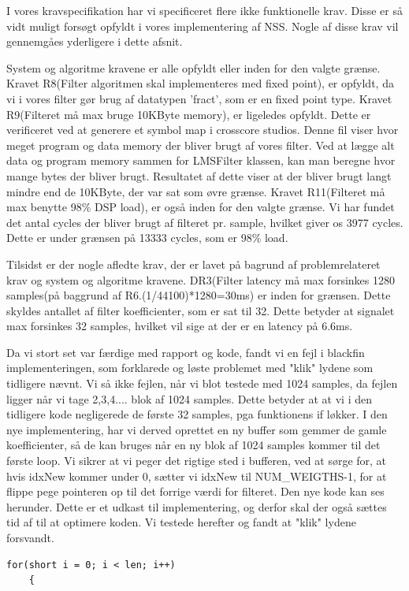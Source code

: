 \begin{description}[align=left]
I vores kravspecifikation har vi specificeret flere ikke funktionelle krav. Disse er så vidt muligt forsøgt opfyldt i vores implementering af NSS. Nogle af disse krav vil gennemgåes yderligere i dette afsnit.

System og algoritme kravene er alle opfyldt eller inden for den valgte grænse. Kravet R8(Filter algoritmen skal implementeres med fixed point), er opfyldt, da vi i vores filter gør brug af datatypen 'fract', som er en fixed point type. Kravet R9(Filteret må max bruge 10KByte memory), er ligeledes opfyldt. Dette er verificeret ved at generere et symbol map i crosscore studios. Denne fil viser hvor meget program og data memory der bliver brugt af vores filter. Ved at lægge alt data og program memory sammen for LMSFilter klassen, kan man beregne hvor mange bytes der bliver brugt. Resultatet af dette viser at der bliver brugt langt mindre end de 10KByte, der var sat som øvre grænse. Kravet R11(Filteret må max benytte 98\% DSP load), er også inden for den valgte grænse. Vi har fundet det antal cycles der bliver brugt af filteret pr. sample, hvilket giver os 3977 cycles. Dette er under grænsen på 13333 cycles, som er 98\% load. 

Tilsidst er der nogle afledte krav, der er lavet på bagrund af problemrelateret krav og system og algoritme kravene. DR3(Filter latency må max forsinkes 1280 samples(på baggrund af R6.(1/44100)*1280=30ms) er inden for grænsen. Dette skyldes antallet af filter koefficienter, som er sat til 32. Dette betyder at signalet max forsinkes 32 samples, hvilket vil sige at der er en latency på 6.6ms. 

\item [Løsning i sidste time.] Da vi stort set var færdige med rapport og kode, fandt vi en fejl i blackfin implementeringen, som forklarede og løste problemet med "klik" lydene som tidligere nævnt. 
Vi så ikke fejlen, når vi blot testede med 1024 samples, da fejlen ligger når vi tage 2,3,4.... blok af 1024 samples. Dette betyder at at vi i den tidligere kode negligerede de første 32 samples, pga funktionens if løkker. I den nye implementering, har vi derved oprettet en ny buffer som gemmer de gamle koefficienter, så de kan bruges når en ny blok af 1024 samples kommer til det første loop. Vi sikrer at vi peger det rigtige sted i bufferen, ved at sørge for, at hvis idxNew kommer under 0, sætter vi idxNew til NUM\_WEIGTHS-1, for at flippe pege pointeren op til det forrige værdi for filteret. Den nye kode kan ses herunder. Dette er et udkast til implementering, og derfor skal der også sættes tid af til at optimere koden. Vi testede herefter og fandt at "klik" lydene forsvandt. \\
\begin{lstlisting}
for(short i = 0; i < len; i++)
	{


\end{lstlisting}
\end{description}
